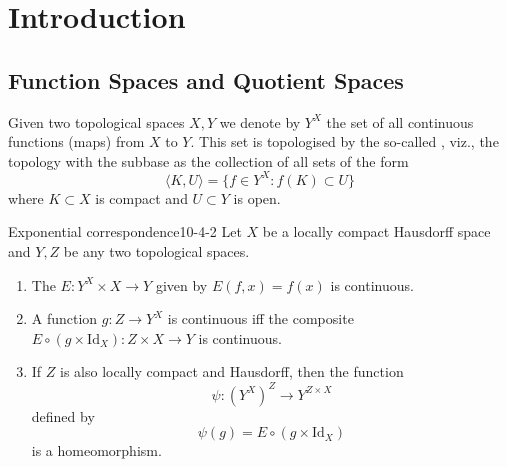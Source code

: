 \documentclass[../main.tex]{subfiles}
\begin{document}
\ifSubfilesClassLoaded{

    \tableofcontents
    
}{}

\chapter{ Introduction }

\section{Function Spaces and Quotient Spaces}

\begin{definition}{}{}
    Given two topological spaces $X, Y$ we denote by $Y^X$ the set of all continuous functions (maps) from $X$ to $Y$. This set is topologised by the so-called , viz., the topology with the subbase as the collection of all sets of the form
\[
\langle K, U \rangle = \{f \in Y^X : f(K) \subset U\}
\]
where $K \subset X$ is compact and $U \subset Y$ is open.
\end{definition}

\begin{theorem}{Exponential correspondence}{10-4-2}
Let $X$ be a locally compact Hausdorff space and $Y,Z$ be any two topological spaces.
\begin{enumerate}
\item[(a)] The  $E:Y^X \times X \to Y$ given by $E(f,x) = f(x)$ is continuous.
\item[(b)] A function $g : Z \to Y^X$ is continuous iff the composite $E \circ (g \times \mathrm{Id}_X) : Z \times X \to Y$ is continuous.
\item[(c)] If $Z$ is also locally compact and Hausdorff, then the function
\[
\psi : (Y^X)^Z \to Y^{Z \times X}
\]
defined by
\[
\psi(g) = E \circ (g \times \mathrm{Id}_X)
\]
is a homeomorphism.
\end{enumerate}
\end{theorem}
\end{document}
